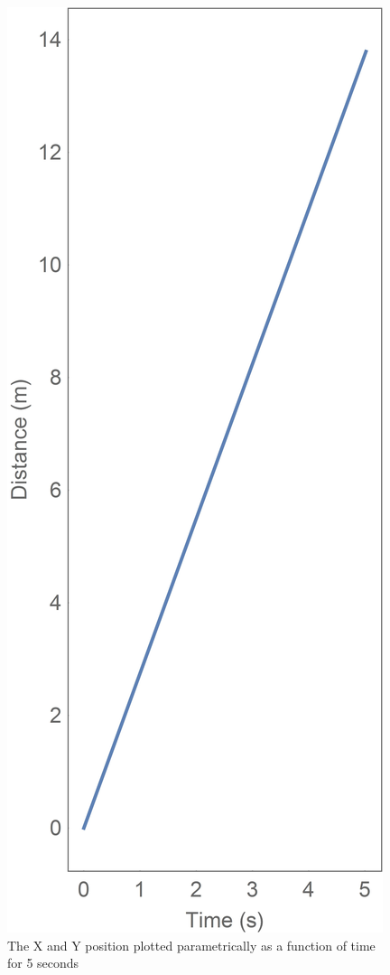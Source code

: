 \begin{figure}[!htb]
	\centering
	\includegraphics[width=\linewidth]{RollingWheelXY.jpg}
	\endminipage\hspace{1em}%
	\caption{The X and Y position plotted parametrically as a function of time for 5 seconds}\label{fig:RollingWheelXY}
\end{figure}

